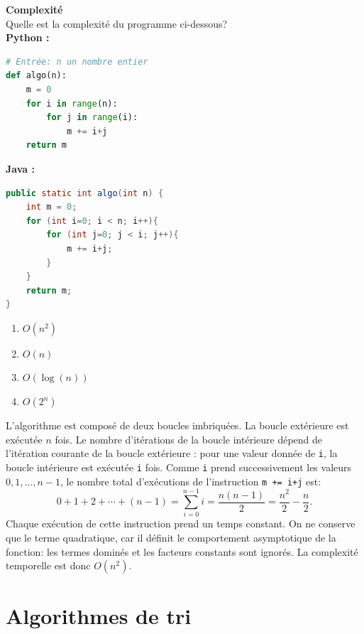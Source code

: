 \begin{Exercice}[10 minutes] \textbf{Complexité \optionnel} \\
    Quelle est la complexité du programme ci-dessous?\\
        \textbf{Python :}
        \begin{lstlisting}[language=Python]
# Entrée: n un nombre entier
def algo(n):
    m = 0
    for i in range(n):
        for j in range(i):
            m += i+j
    return m
        \end{lstlisting}
        
        \textbf{Java :}
        \begin{lstlisting}[language=Java]
public static int algo(int n) {
    int m = 0;
    for (int i=0; i < n; i++){
        for (int j=0; j < i; j++){
            m += i+j;
        }
    }
    return m;
}
        \end{lstlisting}
    
        \begin{enumerate}[label=(\Alph*)]
            \item $O(n^2)$
            \item $O(n)$
            \item $O(\log(n))$
            \item $O(2^n)$
        \end{enumerate}

    \begin{solution} 
    L'algorithme est composé de deux boucles imbriquées.
    La boucle extérieure est exécutée $n$ fois.
    Le nombre d'itérations de la boucle intérieure dépend de l'itération courante de la boucle extérieure : pour une valeur donnée de \texttt{i}, la boucle intérieure est exécutée \texttt{i} fois. Comme \texttt{i} prend successivement les valeurs $0, 1, \ldots, n-1$, le nombre total d'exécutions de l'instruction \lstinline{m += i+j} est:
    \[
        0 + 1 + 2 + \cdots + (n-1)
        = \sum_{i=0}^{n-1} i
        = \frac{n(n-1)}{2}
        = \frac{n^2}{2} - \frac{n}{2}.
    \]
    Chaque exécution de cette instruction prend un temps constant. On ne conserve que le terme quadratique, car il définit le comportement asymptotique de la fonction: les termes dominés et les facteurs constants sont ignorés. La complexité temporelle est donc $O(n^2)$.
    \end{solution}
    
\end{Exercice}

\section{Algorithmes de tri}

